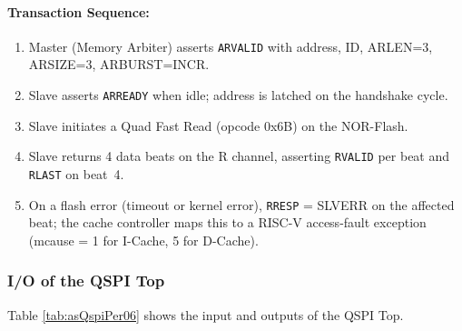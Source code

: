 \paragraph{Transaction Sequence:}
\begin{enumerate}
  \item Master (Memory Arbiter) asserts \texttt{ARVALID} with address, ID, ARLEN=3, ARSIZE=3, ARBURST=INCR.
  \item Slave asserts \texttt{ARREADY} when idle; address is latched on the handshake cycle.
  \item Slave initiates a Quad Fast Read (opcode 0x6B) on the NOR-Flash.
  \item Slave returns 4 data beats on the R channel, asserting \texttt{RVALID} per beat and \texttt{RLAST} on beat~4.
  \item On a flash error (timeout or kernel error), \texttt{RRESP} = SLVERR on the affected beat; the cache controller maps this to a RISC-V access-fault exception (mcause = 1 for I-Cache, 5 for D-Cache).
\end{enumerate}

\subsubsection{I/O of the QSPI Top}

Table \ref{tab:asQspiPer06} shows the input and outputs of the QSPI Top.


